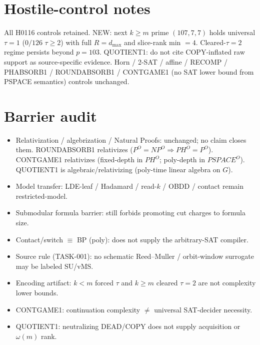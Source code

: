 \documentclass[11pt]{article}
\begin{document}
\section*{Hostile-control notes}
All H0116 controls retained. NEW: next $k{\ge}m$ prime $(107,7,7)$ holds universal
$\tau{=}1$ ($0/126$ $\tau{\ge}2$) with full $R{=}d_{\max}$ and slice-rank min $=4$.
Cleared-$\tau{=}2$ regime persists beyond $p{=}103$. QUOTIENT1: do not cite COPY-inflated
raw support as source-specific evidence. Horn / 2-SAT / affine /
RECOMP / PHABSORB1 / ROUNDABSORB1 / CONTGAME1 (no SAT lower bound from PSPACE semantics)
controls unchanged.

\section*{Barrier audit}
\begin{itemize}
\item Relativization / algebrization / Natural Proofs: unchanged; no claim closes them.
  ROUNDABSORB1 relativizes ($P^O{=}NP^O\Rightarrow PH^O{=}P^O$).
  CONTGAME1 relativizes (fixed-depth in $PH^O$; poly-depth in $PSPACE^O$).
  QUOTIENT1 is algebraic/relativizing (poly-time linear algebra on $G$).
\item Model transfer: LDE-leaf / Hadamard / read-$k$ / OBDD / contact remain restricted-model.
\item Submodular formula barrier: still forbids promoting cut charges to formula size.
\item Contact/switch $\equiv$ BP (poly): does not supply the arbitrary-SAT compiler.
\item Source rule (TASK-001): no schematic Reed--Muller / orbit-window surrogate may be labeled SU/vMS.
\item Encoding artifact: $k{<}m$ forced $\tau$ and $k{\ge}m$ cleared $\tau{=}2$ are not complexity lower bounds.
\item CONTGAME1: continuation complexity $\neq$ universal SAT-decider necessity.
\item QUOTIENT1: neutralizing DEAD/COPY does not supply acquisition or $\omega(m)$ rank.
\end{itemize}
\end{document}
